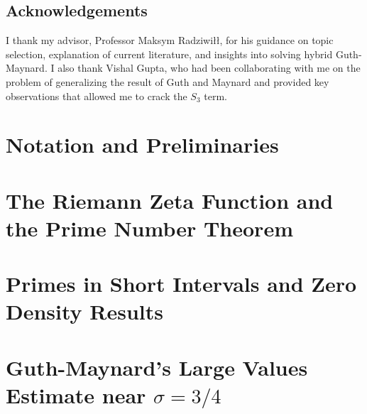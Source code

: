 \documentclass[openany,
ngerman,
toc=flat,
toc=chapterentrywithdots,
captions=tableabove,
listof=entryprefix,
listof=leveldown,
fontsize=12pt,
numbers=noenddot]
{book}
\begin{document}
\section*{Acknowledgements}
I thank my advisor, Professor Maksym Radziwi\l\l, for his guidance on topic selection, explanation of current literature, and insights into solving hybrid Guth-Maynard. 
I also thank Vishal Gupta, who had been collaborating with me on the problem of generalizing the result of Guth and Maynard and provided key observations that allowed 
me to crack the $S_3$ term.
\chapter{Notation and Preliminaries}



	\chapter{ The Riemann Zeta Function and the Prime Number Theorem}
	
	
	\chapter{Primes in Short Intervals and Zero Density Results}
	
	
	\chapter{Guth-Maynard's Large Values Estimate near $\sigma = 3/4$}
	
	
	
	
	
	
	

	\printbibliography
\end{document}
